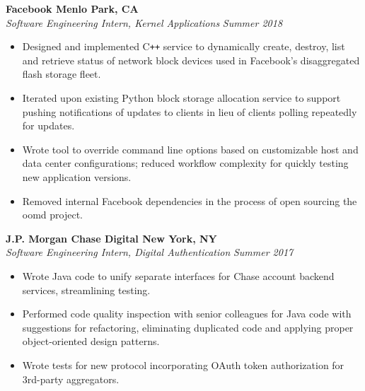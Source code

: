 \documentclass[margin,line]{resume}
\begin{document}
\begin{resume}
	\textbf{Facebook \hfill Menlo Park, CA} \vspace{1mm}\\\vspace{1mm}%
	\textsl{Software Engineering Intern, Kernel Applications} \hfill \textsl{Summer 2018}
	\begin{itemize}[leftmargin=4mm]
		\item Designed and implemented C\texttt{++} service to dynamically create, destroy, list and retrieve status of network block devices used in Facebook's disaggregated flash storage fleet.
		\item Iterated upon existing Python block storage allocation service to support pushing notifications of updates to clients in lieu of clients polling repeatedly for updates.
		\item Wrote tool to override command line options based on customizable host and data center configurations; reduced workflow complexity for quickly testing new application versions.
		\item Removed internal Facebook dependencies in the process of open sourcing the oomd \href{https://github.com/facebookincubator/oomd}{\faGithub} project. 
	\end{itemize}
	\vspace{-1.5mm}
	
	\textbf{J.P. Morgan Chase Digital \hfill New York, NY} \vspace{1mm}\\\vspace{1mm}%
	\textsl{Software Engineering Intern, Digital Authentication} \hfill \textsl{Summer 2017}
	\begin{itemize}[leftmargin=4mm]
		\item Wrote Java code to unify separate interfaces for Chase account backend services, streamlining testing.
		\item Performed code quality inspection with senior colleagues for Java code with suggestions for refactoring, eliminating duplicated code and applying proper object-oriented design patterns.
		\item Wrote tests for new protocol incorporating OAuth token authorization for 3rd-party aggregators.
	\end{itemize}
	\vspace{2.5mm}
	
	\sectionbreak

\end{resume}
\end{document}
